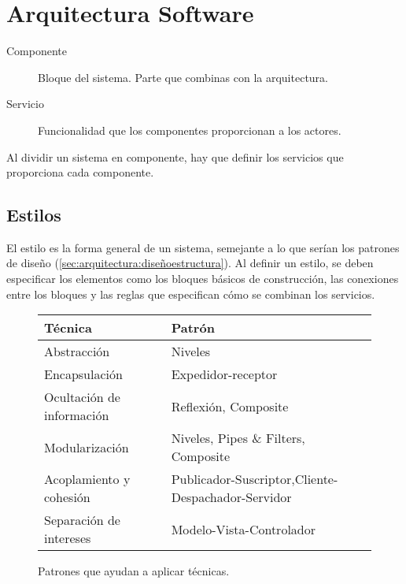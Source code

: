 \section{Arquitectura Software}
\label{sec:arquitectura:arquitectura}


\begin{description}
\item[Componente] Bloque del sistema. Parte que combinas con la arquitectura.
\item[Servicio] Funcionalidad que los componentes proporcionan a los actores.
\end{description}

Al dividir un sistema en componente, hay que definir los servicios que
proporciona cada componente.

\subsection{Estilos}
\label{sec:estilos}

El estilo es la forma general de un sistema, semejante a lo que serían
los patrones de diseño (\ref{sec:arquitectura:diseñoestructura}). Al
definir un estilo, se deben especificar los elementos como los bloques
básicos de construcción, las conexiones entre los bloques y las reglas
que especifican cómo se combinan los servicios.

\begin{figure}[h]
  \centering
  \begin{tabular}{l | l}
    \textbf{Técnica} & \textbf{Patrón}\\\hline
    Abstracción & Niveles \\
    Encapsulación & Expedidor-receptor \\
    Ocultación de información & Reflexión, Composite \\
    Modularización & Niveles, Pipes \& Filters, Composite\\
    Acoplamiento y
    cohesión & Publicador-Suscriptor,Cliente-Despachador-Servidor\\
    Separación de intereses & Modelo-Vista-Controlador
  \end{tabular}
  \caption{Patrones que ayudan a aplicar técnicas.}
  \label{fig:patronesestilo}
\end{figure}

